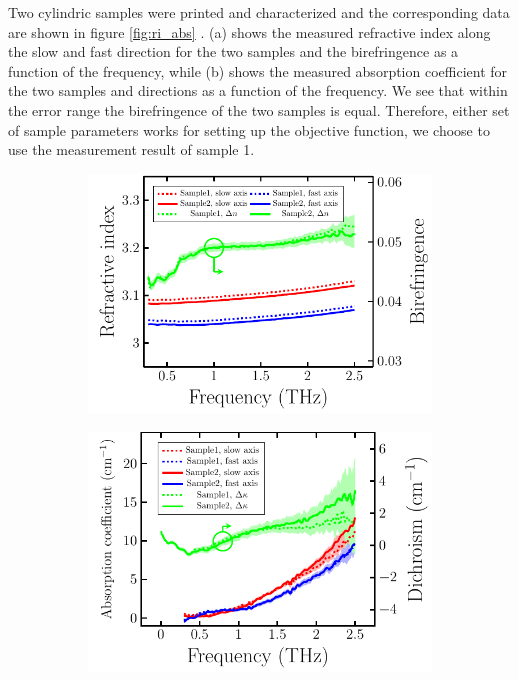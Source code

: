 Two cylindric samples were printed and characterized and the corresponding data are shown in figure \ref{fig:ri_abs} \cite{Ornik2021}. (a) shows the measured refractive index along the slow and fast direction for the two samples and the birefringence as a function of the frequency, while (b) shows the measured absorption coefficient for the two samples and directions as a function of the frequency. We see that within the error range the birefringence of the two samples is equal. Therefore, either set of sample parameters works for setting up the objective function, we choose to use the measurement result of sample 1. 

\begin{figure}[ht]
    \begin{subfigure}[b]{.5\linewidth}
    \caption{}\label{}
    \centering\includegraphics[scale=0.73]{images/results/plots/ceramic/ri_bf_a.pdf}
    \end{subfigure}%
    \hspace{3em}
    \begin{subfigure}[b]{.5\linewidth}
    \caption{}\label{}
    \centering\includegraphics[scale=0.73]{images/results/plots/ceramic/ri_bf_b.pdf}

\end{subfigure}
\end{figure}
